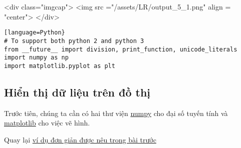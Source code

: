 <div class="imgcap"> 
<img src ="/assets/LR/output_5_1.png" align = "center"> 
</div> 
 
 
\begin{lstlisting}[language=Python}
# To support both python 2 and python 3 
from __future__ import division, print_function, unicode_literals 
import numpy as np  
import matplotlib.pyplot as plt 
\end{lstlisting}
 
\subsection{Hiển thị dữ liệu trên đồ thị}
Trước tiên, chúng ta cần có hai thư viện \href{http://www.numpy.org/}{numpy} cho đại số tuyến tính và \href{http://matplotlib.org/}{matplotlib} cho việc vẽ hình.  
 
Quay lại \href{http://machinelearningcoban.com/2016/12/27/categories/#regression}{ví dụ đơn giản được nêu trong bài trước} 
